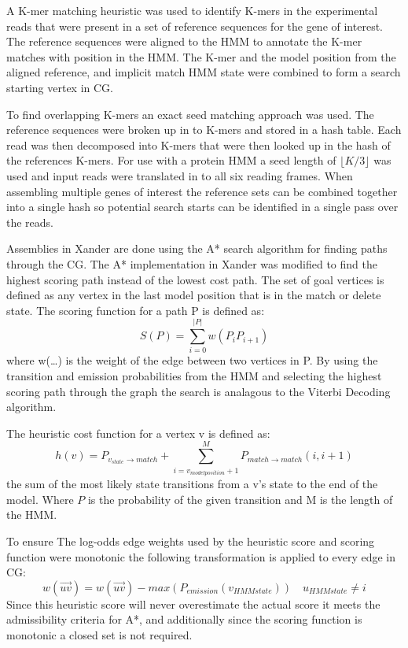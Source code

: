 \documentclass[10pt]{bmc_article}
\newenvironment{bmcformat}{\begin{raggedright}\baselineskip20pt\sloppy\setboolean{publ}{false}}{\end{raggedright}\baselineskip20pt\sloppy}
\begin{document}
\begin{bmcformat}
A K-mer matching heuristic was used to identify K-mers in the experimental reads that were present in a set of reference sequences for the gene of interest.  The reference sequences were aligned to the HMM to annotate the K-mer matches with position in the HMM.  The K-mer and the model position from the aligned reference, and implicit match HMM state were combined to form a search starting vertex in CG.

To find overlapping K-mers an exact seed matching approach was used. The reference sequences were broken up in to K-mers and stored in a hash table. Each read was then decomposed into K-mers that were then looked up in the hash of the references K-mers.  For use with a protein HMM a seed length of $\lfloor K/3\rfloor$ was used and input reads were translated in to all six reading frames. When assembling multiple genes of interest the reference sets can be combined together into a single hash so potential search starts can be identified in a single pass over the reads.

Assemblies in Xander are done using the A* search algorithm\cite{hart_formal_1968} for finding paths through the CG.  The A* implementation in Xander was  modified to find the highest scoring path instead of the lowest cost path. The set of goal vertices is defined as any vertex in the last model position that is in the match or delete state.  The scoring function for a path P is defined as: 
\[S(P) = \sum_{i=0}^{|P|}w(P_iP_{i+1})\] 
where w(\ldots) is the weight of the edge between two vertices in P.  By using the transition and emission probabilities from the HMM and selecting the highest scoring path through the graph the search is analagous to the Viterbi Decoding\cite{viterbi_error_1967} algorithm.

The heuristic cost function for a vertex v is defined as:
\[h(v) = P_{v_{state}\rightarrow match} + \sum_{i=v_{model position} + 1}^{M}P_{match\rightarrow match}(i, i + 1)\]
the sum of the most likely state transitions from a v's state to the end of the model. Where $P$ is the probability of the given transition and M is the length of the HMM.

To ensure The log-odds edge weights used by the heuristic score and scoring function were monotonic the following transformation is applied to every edge in CG:
\[ w(\overrightarrow{uv}) = w(\overrightarrow{uv}) - max(P_{emission}(v_{HMM state})) \quad u_{HMM state} \ne i\]
Since this heuristic score will never overestimate the actual score it meets the admissibility criteria for A*, and additionally since the scoring function is monotonic a closed set is not required.


\end{bmcformat}
\end{document}
